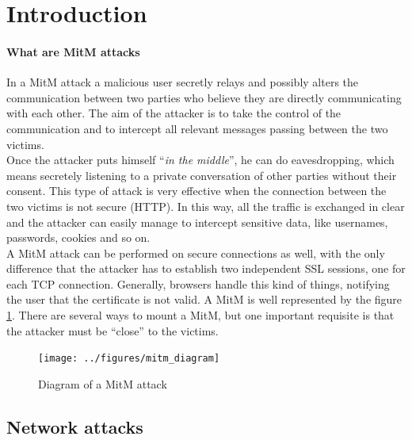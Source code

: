 \documentclass[final]{article}
\begin{document}
\def\snode#1#2#3{%
  \node[long,right=of #1, label=center:#3] (#2) {}}

\def\dnode#1#2#3{%
  \node[double,right=of #1, label=center:#3] (#2) {}}




\tableofcontents
\newpage

\section{Introduction}
\paragraph{What are \ac{MitM} attacks}
In a \ac{MitM} attack a malicious user secretly relays
and possibly alters the communication between two parties who believe they
are directly communicating with each other. The aim of the attacker is to
take the control of the communication and to intercept all relevant messages
passing between the two victims. \\
Once the attacker puts himself ``\textit{in the middle}'', he can do eavesdropping,
which means secretely listening to a private conversation of other parties without their consent.
This type of attack is very effective when the connection between the two
victims is not secure (HTTP).
In this way, all the traffic is exchanged in clear and the attacker can
easily manage to intercept sensitive data, like usernames, passwords, cookies and so on. \\
A \ac{MitM} attack can be performed on secure connections as well,
with the only difference that the attacker has to establish
two independent SSL sessions, one for each TCP connection.
Generally, browsers handle this kind of things,
notifying the user that the certificate is not valid.
A \ac{MitM} is well represented by the figure \ref{mitm}.
There are several ways to mount a \ac{MitM},
but one important requisite is that the attacker must be ``close''
to the victims.
\begin{figure}
\center
\texttt{[image: ../figures/mitm\_diagram]}
\caption{Diagram of a \ac{MitM} attack}
\label{mitm}
\end{figure}


\subsection{Network attacks}
\end{document}
